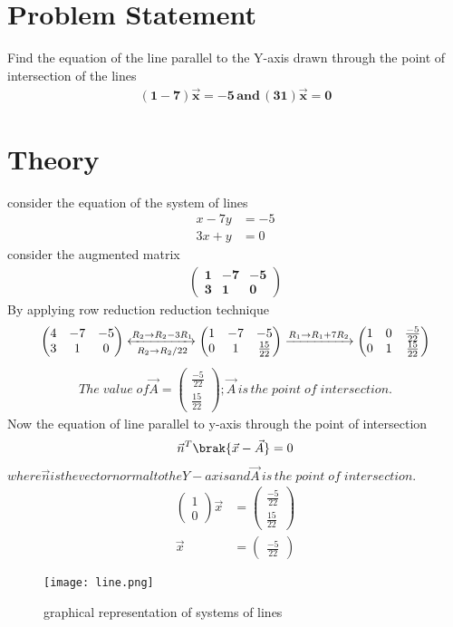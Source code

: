 \documentclass{article}
\newcommand{\myvec}[1]{\ensuremath{\begin{pmatrix}#1\end{pmatrix}}}
\begin{document}
\section{Problem Statement}
Find the equation of the line parallel to the Y-axis drawn through the point of intersection of the lines
\begin{align}
\mathbf{{(1 -7)\vec{x}=-5 \, and \, (3 1)\vec{x}=0}}
\end{align}
\section{Theory}
consider the equation of the system of lines
\begin{align}
x - 7y & = -5 \\
3x + y & = 0
\end{align}
 consider the augmented matrix
 \begin{align}
 \boldsymbol{{\myvec{1 & -7 & -5 \\ 3 & 1 & 0}}}
 \end{align}
 By applying row reduction reduction technique \\
 \begin{align}
\myvec{4 & -7 & -5\\ 3 & 1 & 0}
	\xleftrightarrow[R_2 \rightarrow R_2/22]{R_2 \rightarrow R_2-3R_1}
	\myvec{1 & -7 & -5 \\ 0 & 1 & \frac{15}{22}}
	\xrightarrow[]{R_1 \rightarrow R_1+7R_2}
	 \myvec{1 & 0 & \frac{-5}{22} \\ 0 & 1 & \frac{15}{22}}
 \end{align}
\begin{align}
The\; value\; of\vec{A} = \myvec{\frac{-5}{22} \\ \frac{15}{22}} ;
\vec{A} \,is\, the\; point\; of \;intersection.
\end{align}
 Now the equation of line parallel to y-axis through the point of intersection\\
\begin{align}
 \vec{n}^T\brak{\vec{x}-\vec{A}} = 0     
\end{align}
$where \vec{n}  is the vector normal to the Y - axis and\vec{A}\, is\, the\; point\; of\; intersection.$
\begin{align}
 \myvec{1 \\ 0}\vec{x} & = \myvec{ \frac{-5}{22}\\ \frac{15}{22}}
 \\
\vec{x} & = \myvec{\frac{-5}{22}} 
 \end{align}
 \begin{figure}
 \centering
 \texttt{[image: line.png]}
 \caption{graphical representation of systems of lines}
 \end{figure}
 
 
  
\end{document}

